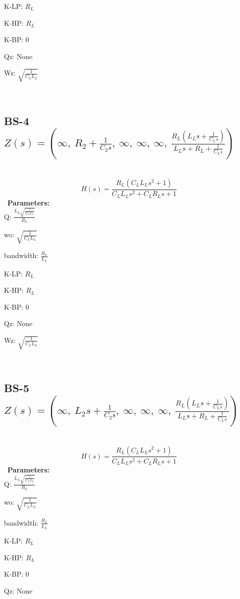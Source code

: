 \documentclass{article}
\begin{document}
K-LP: $R_{L}$\ 

K-HP: $R_{L}$\ 

K-BP: $0$\ 

Qz: $\text{None}$\ 

Wz: $\sqrt{\frac{1}{C_{L} L_{L}}}$\ 

\ 

\subsection{BS-4 $Z(s) = \left( \infty, \  R_{2} + \frac{1}{C_{2} s}, \  \infty, \  \infty, \  \infty, \  \frac{R_{L} \left(L_{L} s + \frac{1}{C_{L} s}\right)}{L_{L} s + R_{L} + \frac{1}{C_{L} s}}\right)$ } \ 
\textbf{\[H(s) = \frac{R_{L} \left(C_{L} L_{L} s^{2} + 1\right)}{C_{L} L_{L} s^{2} + C_{L} R_{L} s + 1}\] } \ 
\textbf{Parameters:}\\ 

Q: $\frac{L_{L} \sqrt{\frac{1}{C_{L} L_{L}}}}{R_{L}}$\ 

wo: $\sqrt{\frac{1}{C_{L} L_{L}}}$\ 

bandwidth: $\frac{R_{L}}{L_{L}}$\ 

K-LP: $R_{L}$\ 

K-HP: $R_{L}$\ 

K-BP: $0$\ 

Qz: $\text{None}$\ 

Wz: $\sqrt{\frac{1}{C_{L} L_{L}}}$\ 

\ 

\subsection{BS-5 $Z(s) = \left( \infty, \  L_{2} s + \frac{1}{C_{2} s}, \  \infty, \  \infty, \  \infty, \  \frac{R_{L} \left(L_{L} s + \frac{1}{C_{L} s}\right)}{L_{L} s + R_{L} + \frac{1}{C_{L} s}}\right)$ } \ 
\textbf{\[H(s) = \frac{R_{L} \left(C_{L} L_{L} s^{2} + 1\right)}{C_{L} L_{L} s^{2} + C_{L} R_{L} s + 1}\] } \ 
\textbf{Parameters:}\\ 

Q: $\frac{L_{L} \sqrt{\frac{1}{C_{L} L_{L}}}}{R_{L}}$\ 

wo: $\sqrt{\frac{1}{C_{L} L_{L}}}$\ 

bandwidth: $\frac{R_{L}}{L_{L}}$\ 

K-LP: $R_{L}$\ 

K-HP: $R_{L}$\ 

K-BP: $0$\ 

Qz: $\text{None}$\ 
\end{document}
